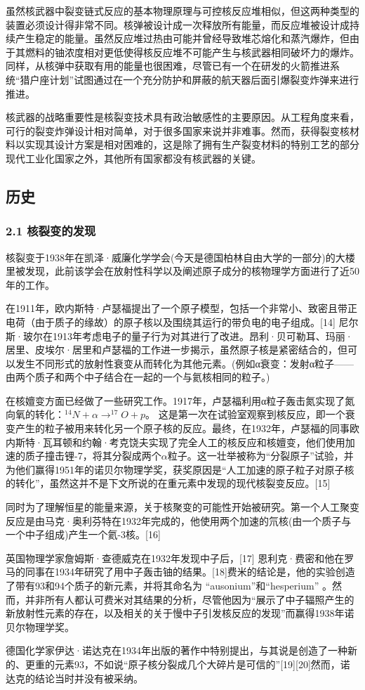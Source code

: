 虽然核武器中裂变链式反应的基本物理原理与可控核反应堆相似，但这两种类型的装置必须设计得非常不同。核弹被设计成一次释放所有能量，而反应堆被设计成持续产生稳定的能量。虽然反应堆过热由可能并曾经导致堆芯熔化和蒸汽爆炸，但由于其燃料的铀浓度相对更低使得核反应堆不可能产生与核武器相同破坏力的爆炸。同样，从核弹中获取有用的能量也很困难，尽管已有一个在研发的火箭推进系统“猎户座计划”试图通过在一个充分防护和屏蔽的航天器后面引爆裂变炸弹来进行推进。

核武器的战略重要性是核裂变技术具有政治敏感性的主要原因。从工程角度来看，可行的裂变炸弹设计相对简单，对于很多国家来说并非难事。然而，获得裂变核材料以实现其设计方案是相对困难的，这是除了拥有生产裂变材料的特别工艺的部分现代工业化国家之外，其他所有国家都没有核武器的关键。

\subsection{历史}
\subsubsection{2.1 核裂变的发现}
核裂变于1938年在凯泽·威廉化学学会(今天是德国柏林自由大学的一部分)的大楼里被发现，此前该学会在放射性科学以及阐述原子成分的核物理学方面进行了近50年的工作。

在1911年，欧内斯特·卢瑟福提出了一个原子模型，包括一个非常小、致密且带正电荷（由于质子的缘故）的原子核以及围绕其运行的带负电的电子组成。[14] 尼尔斯·玻尔在1913年考虑电子的量子行为对其进行了改进。昂利·贝可勒耳、玛丽·居里、皮埃尔·居里和卢瑟福的工作进一步揭示，虽然原子核是紧密结合的，但可以发生不同形式的放射性衰变从而转化为其他元素。(例如α衰变：发射α粒子——由两个质子和两个中子结合在一起的一个与氦核相同的粒子。)

在核嬗变方面已经做了一些研究工作。1917年，卢瑟福利用α粒子轰击氮实现了氮向氧的转化：$^{14}N + \alpha \to ^{17}O + p$。 这是第一次在试验室观察到核反应，即一个衰变产生的粒子被用来转化另一个原子核的反应。最终，在1932年，卢瑟福的同事欧内斯特·瓦耳顿和约翰·考克饶夫实现了完全人工的核反应和核嬗变，他们使用加速的质子撞击锂-7，将其分裂成两个$\alpha$粒子。这一壮举被称为“分裂原子”试验，并为他们赢得1951年的诺贝尔物理学奖，获奖原因是“人工加速的原子粒子对原子核的转化”，虽然这并不是下文所说的在重元素中发现的现代核裂变反应。[15]

同时为了理解恒星的能量来源，关于核聚变的可能性开始被研究。第一个人工聚变反应是由马克·奥利芬特在1932年完成的，他使用两个加速的氘核(由一个质子与一个中子组成)产生一个氦-3核。[16]

英国物理学家詹姆斯·查德威克在1932年发现中子后，[17] 恩利克·费密和他在罗马的同事在1934年研究了用中子轰击铀的结果。[18]费米的结论是，他的实验创造了带有93和94个质子的新元素，并将其命名为 “ausonium”和“hesperium” 。然而，并非所有人都认可费米对其结果的分析，尽管他因为“展示了中子辐照产生的新放射性元素的存在，以及相关的关于慢中子引发核反应的发现”而赢得1938年诺贝尔物理学奖。

德国化学家伊达·诺达克在1934年出版的著作中特别提出，与其说是创造了一种新的、更重的元素93，不如说“原子核分裂成几个大碎片是可信的”[19][20]然而，诺达克的结论当时并没有被采纳。
